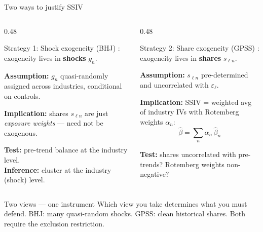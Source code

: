 \documentclass[aspectratio=169, 10pt]{beamer}
\begin{document}
\begin{frame}[shrink=5]{Two ways to justify SSIV}

  \begin{columns}[T]
    \begin{column}{0.48\textwidth}
      \begin{block}{Strategy 1: Shock exogeneity (BHJ)}\small
        \citet{borusyak2022}: exogeneity lives in \textbf{shocks} $g_n$.

        \smallskip
        \textbf{Assumption:} $g_n$ quasi-randomly assigned across
        industries, conditional on controls.

        \smallskip
        \textbf{Implication:} shares $s_{\ell n}$ are just
        \emph{exposure weights} — need not be exogenous.

        \smallskip
        \textbf{Test:} pre-trend balance at the industry level.\\
        \textbf{Inference:} cluster at the industry (shock) level.
      \end{block}
    \end{column}
    \begin{column}{0.48\textwidth}
      \begin{block}{Strategy 2: Share exogeneity (GPSS)}\small
        \citet{goldsmithpinkham2020}: exogeneity lives in
        \textbf{shares} $s_{\ell n}$.

        \smallskip
        \textbf{Assumption:} $s_{\ell n}$ pre-determined and
        uncorrelated with $\varepsilon_\ell$.

        \smallskip
        \textbf{Implication:} SSIV = weighted avg of
        industry IVs with Rotemberg weights $\alpha_n$:
        \[
          \hat\beta = \textstyle\sum_n \alpha_n\, \hat\beta_n
        \]

        \textbf{Test:} shares uncorrelated with pre-trends?
        Rotemberg weights non-negative?
      \end{block}
    \end{column}
  \end{columns}

  \smallskip
  \begin{alertblock}{Two views — one instrument}\small
    Which view you take determines what you must defend.
    BHJ: many quasi-random shocks.
    GPSS: clean historical shares.
    Both require the exclusion restriction.
  \end{alertblock}

\end{frame}
\end{document}
